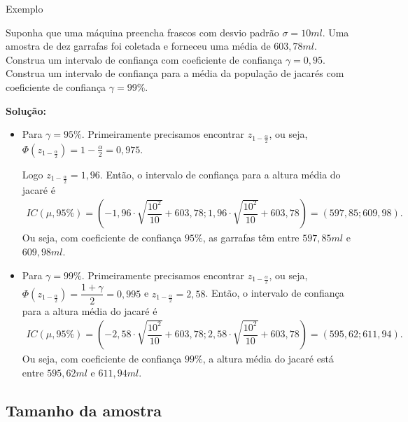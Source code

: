 \documentclass[8pt]{beamer}
\begin{document}
\begin{frame}{Exemplo}

{\small
 Suponha que uma máquina preencha frascos com desvio padrão $\sigma=10ml$. Uma amostra de dez garrafas foi coletada e forneceu uma média de $603,78ml$. Construa um intervalo de confiança
 com coeficiente de confiança $\gamma = 0,95$. Construa um intervalo de confiança para a média da população de jacarés com coeficiente de confiança $\gamma = 99\%$.
 \vfill

 \textbf{Solução:}
 \begin{itemize}
  \item Para $\gamma = 95\%$. Primeiramente precisamos encontrar $z_{1-\frac{\alpha}{2}}$, ou seja,  $ \Phi(z_{1-\frac{\alpha}{2}}) = 1 - \frac{\alpha}{2} = 0,975 $. 
  
  Logo $z_{1-\frac{\alpha}{2}} = 1,96$. Então, o intervalo de confiança para a altura média do jacaré é 
 \begin{align*}
  IC(\mu,95\%) = \left( -1,96 \cdot \sqrt{\dfrac{10^2}{10}} + 603,78;1,96 \cdot \sqrt{\dfrac{10^2}{10}} + 603,78 \right) = (597,85; 609,98).
 \end{align*}
 Ou seja, com coeficiente de confiança $95\%$, as garrafas têm entre $597,85ml$ e $609,98ml$.

 \item Para $\gamma = 99\%$. Primeiramente precisamos encontrar $z_{1-\frac{\alpha}{2}}$, ou seja,  $ \Phi(z_{1-\frac{\alpha}{2}}) = \dfrac{1+\gamma}{2} = 0,995$ e  $z_{1-\frac{\alpha}{2}} = 2,58$. Então, o intervalo de confiança para a altura média do jacaré é 
 \begin{align*}
  IC(\mu,95\%) = \left( -2,58 \cdot \sqrt{\dfrac{10^2}{10}} + 603,78;2,58 \cdot \sqrt{\dfrac{10^2}{10}} + 603,78 \right) = (595,62;611,94).
 \end{align*}
 Ou seja, com coeficiente de confiança $99\%$, a altura média do jacaré está entre $595,62ml$ e $611,94ml$.
 \end{itemize}
}
\end{frame}

\subsection{Tamanho da amostra}
\end{document}
